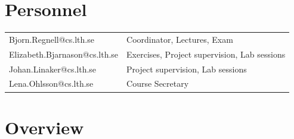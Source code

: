\documentclass[10pt,a4paper]{article}
\begin{document}
\section{Personnel}
\begin{flushleft}
\setlength{\tabcolsep}{0pt}
\begin{tabular}{p{} p{}}
Bjorn.Regnell@cs.lth.se & Coordinator, Lectures, Exam \\
Elizabeth.Bjarnason@cs.lth.se & Exercises, Project supervision, Lab sessions \\
Johan.Linaker@cs.lth.se & Project supervision, Lab sessions \\
Lena.Ohlsson@cs.lth.se & Course Secretary \\
\end{tabular}
\end{flushleft}




\newpage
\section{Overview}
\end{document}
